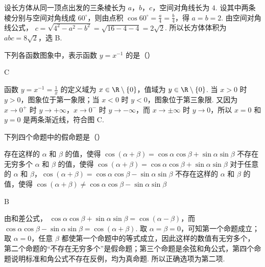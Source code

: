 \documentclass[UTF8,a4paper,oneside,11pt]{ctexbook}
\begin{document}
\begin{solution}
设长方体从同一顶点出发的三条棱长为 \(a\)，\(b\)，\(c\)，空间对角线长为 \(4\). 设其中两条棱分别与空间对角线成 \(60^{\circ}\)，则由点积
\(\cos60^{\circ}=\frac{a}{4}=\frac{b}{4}\)，得 \(a=b=2\). 由空间对角线公式，
\(c=\sqrt{4^2-a^2-b^2}=\sqrt{16-4-4}=2\sqrt2\). 所以长方体体积为 \(abc=8\sqrt2\)，选 B.
\end{solution}

\begin{problem}
下列各函数图象中，表示函数 \(y = x^{-1}\) 的是（\quad）

\choices
    {}
    {}
    {}
    {}
\end{problem}

\begin{answer}
C
\end{answer}

\begin{solution}
函数 \(y=x^{-1}=\frac1x\) 的定义域为 \(x\in\R\mathbin{\backslash}\{0\}\)，值域为 \(y\in\R\mathbin{\backslash}\{0\}\). 当 \(x>0\) 时 \(y>0\)，图象位于第一象限；当 \(x<0\) 时 \(y<0\)，图象位于第三象限. 又因为 \(x\to0^+\) 时 \(y\to+\infty\)，\(x\to0^-\) 时 \(y\to-\infty\)，而 \(x\to\pm\infty\) 时 \(y\to0\)，所以 \(x=0\) 和 \(y=0\) 是两条渐近线，符合图 C.
\end{solution}

\begin{problem}
下列四个命题中的假命题是（\quad）

\choices
    {存在这样的 \(\alpha\) 和 \(\beta\) 的值，使得 \(\cos(\alpha + \beta) = \cos \alpha \cos \beta + \sin \alpha \sin \beta\)}
    {不存在无穷多个 \(\alpha\) 和 \(\beta\) 的值，使得 \(\cos(\alpha + \beta) = \cos \alpha \cos \beta + \sin \alpha \sin \beta\)}
    {对于任意的 \(\alpha\) 和 \(\beta\)，\(\cos(\alpha + \beta) = \cos \alpha \cos \beta - \sin \alpha \sin \beta\)}
    {不存在这样的 \(\alpha\) 和 \(\beta\) 的值，使得 \(\cos(\alpha + \beta) \neq \cos \alpha \cos \beta - \sin \alpha \sin \beta\)}
\end{problem}

\begin{answer}
B
\end{answer}

\begin{solution}
由和差公式，
\(\cos\alpha\cos\beta+\sin\alpha\sin\beta=\cos(\alpha-\beta)\)，而
\(\cos\alpha\cos\beta-\sin\alpha\sin\beta=\cos(\alpha+\beta)\). 取 \(\alpha=\beta=0\)，可知第一个命题成立；取 \(\alpha=0\)，任意 \(\beta\) 都使第一个命题中的等式成立，因此这样的数值有无穷多个，第二个命题的“不存在无穷多个”是假命题；第三个命题是余弦和角公式，第四个命题说明标准和角公式不存在反例，均为真命题. 所以正确选项为第二项.
\end{solution}
\end{document}
